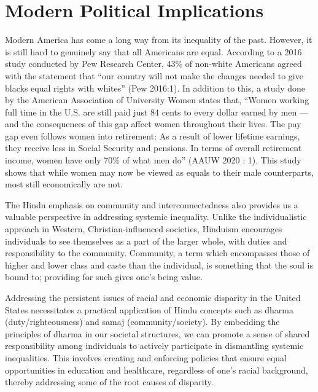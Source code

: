 \documentclass[
	letterpaper, %
	10pt, %
	unnumberedsections, %
	twoside, %
]{LTJournalArticle}
\begin{document}
\section{Modern Political Implications}

Modern America has come a long way from its inequality of the past. However, it is still hard to genuinely say that all Americans are equal. According to a 2016 study conducted by Pew Research Center,  43\% of non-white Americans agreed with the statement that “our country will not make the changes needed to give blacks equal rights with whites” (Pew 2016:1). In addition to this, a study done by the American Association of University Women states that, “Women working full time in the U.S. are still paid just 84 cents to every dollar earned by men — and the consequences of this gap affect women throughout their lives. The pay gap even follows women into retirement: As a result of lower lifetime earnings, they receive less in Social Security and pensions. In terms of overall retirement income, women have only 70\% of what men do” (AAUW 2020 : 1). This study shows that while women may now be viewed as equals to their male counterparts, most still economically are not. 

The Hindu emphasis on community and interconnectedness also provides us a valuable perspective in addressing systemic inequality. Unlike the individualistic approach in Western, Christian-influenced societies, Hinduism encourages individuals to see themselves as a part of the larger whole, with duties and responsibility to the community. Community, a term which encompasses those of higher and lower class and caste than the individual, is something that the soul is bound to; providing for such gives one’s being value.

Addressing the persistent issues of racial and economic disparity in the United States necessitates a practical application of Hindu concepts such as dharma (duty/righteousness) and samaj (community/society). By embedding the principles of dharma in our societal structures, we can promote a sense of shared responsibility among individuals to actively participate in dismantling systemic inequalities. This involves creating and enforcing policies that ensure equal opportunities in education and healthcare, regardless of one's racial background, thereby addressing some of the root causes of disparity.
\end{document}
